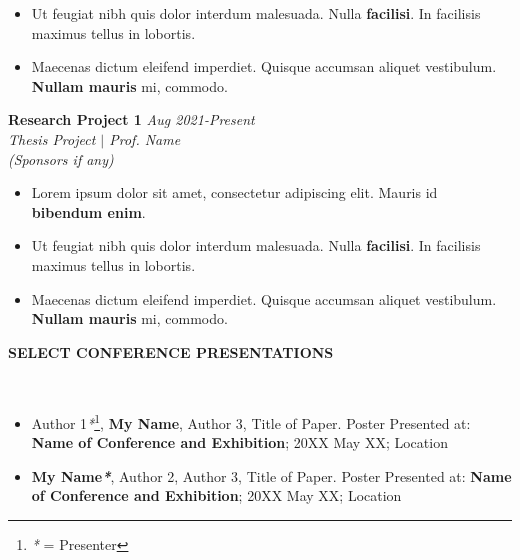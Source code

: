\documentclass[9pt]{article}
\newenvironment{changemargin}[2]{%
  \begin{list}{}{%
    \setlength{\topsep}{0pt}%
    \setlength{\leftmargin}{#1}%
    \setlength{\rightmargin}{#2}%
    \setlength{\listparindent}{\parindent}%
    \setlength{\itemindent}{\parindent}%
    \setlength{\parsep}{\parskip}%
  }%
  \item[]}{\end{list}
}
\newcommand{\lineover}{
	\begin{changemargin}{-0.05in}{-0.05in}
		\vspace*{-8pt}
		\hrulefill \\
		\vspace*{-2pt}
	\end{changemargin}
}
\newcommand{\header}[1]{
	\begin{changemargin}{-0.7in}{-0.35in}
		\begin{large}
		\scshape{\textbf{#1}}\\
		\end{large}
  	\lineover
	\end{changemargin}
}
\newcommand{\jobdescription}[1]{
	\begin{changemargin}{0.05in}{0.05in}
    \smallskip
		{#1}
    \medskip
	\end{changemargin}
}
\newcommand{\jobtitle}[3]{
	\textbf{#1} \hfill \emph{#3}\\
	\emph{#2}
}
\newenvironment{body} {
	\vspace*{-16pt}
	\begin{changemargin}{-0.65in}{-0.5in}
  }	
	{\end{changemargin}
}
\begin{document}
\begin{body}
{\begin{itemize}
  		\item Ut feugiat nibh quis dolor interdum malesuada. Nulla \textbf{facilisi}. In facilisis maximus tellus in lobortis.  
  \item Maecenas dictum eleifend imperdiet. Quisque accumsan aliquet vestibulum. \textbf{Nullam mauris} mi, commodo. 
  	\end{itemize}
  }
    \jobtitle{Research Project 1}{Thesis Project $|$ Prof. Name \\(Sponsors if any)}{Aug 2021-Present}
  \jobdescription{
  	\begin{itemize} \itemsep -0pt  %
  		\item Lorem ipsum dolor sit amet, consectetur adipiscing elit. Mauris id \textbf{bibendum enim}. 
  		\item Ut feugiat nibh quis dolor interdum malesuada. Nulla \textbf{facilisi}. In facilisis maximus tellus in lobortis.  
  \item Maecenas dictum eleifend imperdiet. Quisque accumsan aliquet vestibulum. \textbf{Nullam mauris} mi, commodo. 
  	\end{itemize}
  }


\end{body}
\medskip
\pagebreak


\medskip

\header{SELECT CONFERENCE PRESENTATIONS} 

\begin{body}
	\vspace{14pt}
	

  	\begin{itemize} \itemsep -0pt
      \item Author 1\emph{*}\footnote{\emph{*} = Presenter}, \textbf{My Name}, Author 3, Title of Paper. Poster Presented at: \textbf{ Name of Conference and Exhibition}; 20XX May XX; Location 
            \item \textbf{My Name\emph{*}}, Author 2, Author 3, Title of Paper. Poster Presented at: \textbf{Name of Conference and Exhibition}; 20XX May XX; Location
             
  	\end{itemize} 
\end{body}
\end{document}
